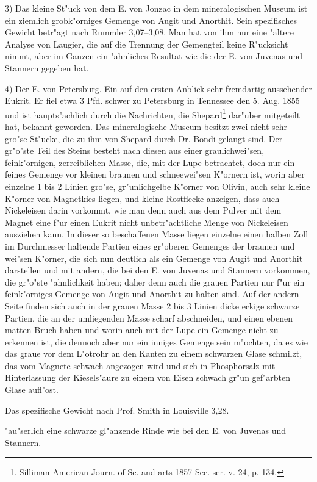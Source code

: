 \documentclass[a4paper, 11pt, oneside]{article}
\begin{document}
3) Das kleine St"uck von dem E. von Jonzac in dem mineralogischen Museum ist ein ziemlich grobk"orniges Gemenge von Augit und Anorthit. Sein spezifisches Gewicht betr"agt nach Rummler 3,07--3,08. Man hat von ihm nur eine "altere Analyse von Laugier, die auf die Trennung der Gemengteil keine R"ucksicht nimmt, aber im Ganzen ein "ahnliches Resultat wie die der E. von Juvenas und Stannern gegeben hat.

4) Der E. von Petersburg. Ein auf den ersten Anblick sehr fremdartig aussehender Eukrit. Er fiel etwa 3 Pfd. schwer zu Petersburg in Tennessee den 5. Aug. 1855 und ist haupts"achlich durch die Nachrichten, die Shepard\footnote{Silliman American Journ. of Sc. and arts 1857 Sec. ser. v. 24, p. 134.} dar"uber mitgeteilt hat, bekannt geworden. Das mineralogische Museum besitzt zwei nicht sehr gro"se St"ucke, die zu ihm von Shepard durch Dr. Bondi gelangt sind. Der gr"o"ste Teil des Steins besteht nach diesen aus einer graulichwei"sen, feink"ornigen, zerreiblichen Masse, die, mit der Lupe betrachtet, doch nur ein feines Gemenge vor kleinen braunen und schneewei"sen K"ornern ist, worin aber einzelne 1 bis 2 Linien gro"se, gr"unlichgelbe K"orner von Olivin, auch sehr kleine K"orner von Magnetkies liegen, und kleine Rostflecke anzeigen, dass auch Nickeleisen darin vorkommt, wie man denn auch aus dem Pulver mit dem Magnet eine f"ur einen Eukrit nicht unbetr"achtliche Menge von Nickeleisen ausziehen kann. In dieser so beschaffenen Masse liegen einzelne einen halben Zoll im Durchmesser haltende Partien eines gr"oberen Gemenges der braunen und wei"sen K"orner, die sich nun deutlich als ein Gemenge von Augit und Anorthit darstellen und mit andern, die bei den E. von Juvenas und Stannern vorkommen, die gr"o"ste "ahnlichkeit haben; daher denn auch die grauen Partien nur f"ur ein feink"orniges Gemenge von Augit und Anorthit zu halten sind. Auf der andern Seite finden sich auch in der grauen Masse 2 bis 3 Linien dicke eckige schwarze Partien, die an der umliegenden Masse scharf abschneiden, und einen ebenen matten Bruch haben und worin auch mit der Lupe ein Gemenge nicht zu erkennen ist, die dennoch aber nur ein inniges Gemenge sein m"ochten, da es wie das graue vor dem L"otrohr an den Kanten zu einem schwarzen Glase schmilzt, das vom Magnete schwach angezogen wird und sich in Phosphorsalz mit Hinterlassung der Kiesels"aure zu einem von Eisen schwach gr"un gef"arbten Glase aufl"ost.

Das spezifische Gewicht nach Prof. Smith in Louisville 3,28.

"au"serlich eine schwarze gl"anzende Rinde wie bei den E. von Juvenas und Stannern.
\end{document}
